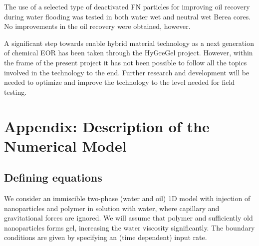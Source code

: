 \documentclass[journal = enfuem, manuscript =  article]{achemso}
\begin{document}
The use of a selected type of deactivated FN particles for improving oil recovery during water flooding was tested in both water wet and neutral wet Berea cores. No improvements in the oil recovery were obtained, however.

A significant step towards enable hybrid material technology as a next generation of chemical EOR has been taken through the HyGreGel project. However, within the frame of the present project it has not been possible to follow all the topics involved in the technology to the end. Further research and development will be needed to optimize and improve the technology to the level needed for field testing. 


\section{Appendix: Description of the Numerical Model}
\subsection{Defining equations}
We consider an immiscible two-phase (water and oil) 1D model with injection of nanoparticles and polymer in solution with water, where capillary and gravitational forces are ignored. We will assume that polymer and sufficiently old nanoparticles forms gel, increasing the water viscosity significantly. The boundary conditions are given by specifying an (time dependent) input rate. 
\end{document}
